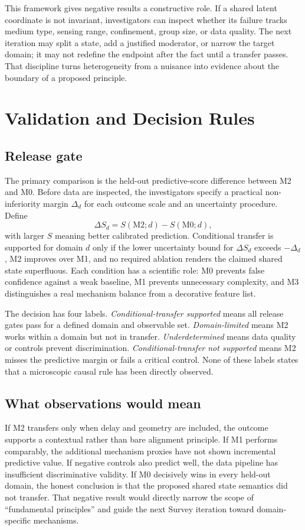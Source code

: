 \documentclass[conference]{../../../../Conference-LaTeX-template_10-17-19/IEEEtran}
\begin{document}
This framework gives negative results a constructive role. If a shared latent coordinate is not invariant, investigators can inspect whether its failure tracks medium type, sensing range, confinement, group size, or data quality. The next iteration may split a state, add a justified moderator, or narrow the target domain; it may not redefine the endpoint after the fact until a transfer passes. That discipline turns heterogeneity from a nuisance into evidence about the boundary of a proposed principle.
\section{Validation and Decision Rules}
\subsection{Release gate}
The primary comparison is the held-out predictive-score difference between M2 and M0. Before data are inspected, the investigators specify a practical non-inferiority margin $\Delta_d$ for each outcome scale and an uncertainty procedure. Define
\begin{equation}
\Delta S_d=S(\mathrm{M2};d)-S(\mathrm{M0};d),
\end{equation}
with larger $S$ meaning better calibrated prediction. Conditional transfer is supported for domain $d$ only if the lower uncertainty bound for $\Delta S_d$ exceeds $-\Delta_d$, M2 improves over M1, and no required ablation renders the claimed shared state superfluous. Each condition has a scientific role: M0 prevents false confidence against a weak baseline, M1 prevents unnecessary complexity, and M3 distinguishes a real mechanism balance from a decorative feature list.

The decision has four labels. \emph{Conditional-transfer supported} means all release gates pass for a defined domain and observable set. \emph{Domain-limited} means M2 works within a domain but not in transfer. \emph{Underdetermined} means data quality or controls prevent discrimination. \emph{Conditional-transfer not supported} means M2 misses the predictive margin or fails a critical control. None of these labels states that a microscopic causal rule has been directly observed.

\subsection{What observations would mean}
If M2 transfers only when delay and geometry are included, the outcome supports a contextual rather than bare alignment principle. If M1 performs comparably, the additional mechanism proxies have not shown incremental predictive value. If negative controls also predict well, the data pipeline has insufficient discriminative validity. If M0 decisively wins in every held-out domain, the honest conclusion is that the proposed shared state semantics did not transfer. That negative result would directly narrow the scope of ``fundamental principles'' and guide the next Survey iteration toward domain-specific mechanisms.
\end{document}
